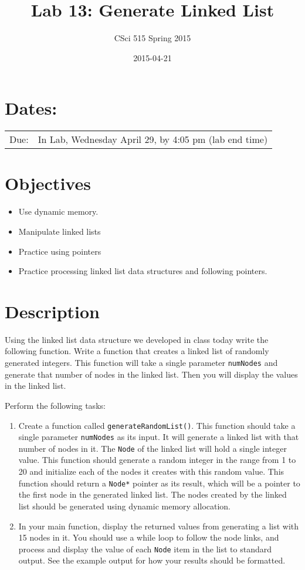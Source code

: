 \documentclass[11pt]{article}
\title{Lab 13: Generate Linked List}
\author{CSci 515 Spring 2015}
\date{2015-04-21}
\begin{document}
\maketitle


\section*{Dates:}
\label{sec-1}


\begin{center}
\begin{tabular}{ll}
 Due:  &  In Lab, Wednesday April 29, by 4:05 pm (lab end time)  \\
\end{tabular}
\end{center}
\section*{Objectives}
\label{sec-2}

\begin{itemize}
\item Use dynamic memory.
\item Manipulate linked lists
\item Practice using pointers
\item Practice processing linked list data structures and following pointers.
\end{itemize}
\section*{Description}
\label{sec-3}

Using the linked list data structure we developed in class today write
the following function.  Write a function that creates
a linked list of randomly generated integers.  This function
will take a single parameter \verb~numNodes~ and generate that number of nodes
in the linked list.  Then you will display the values in the linked
list.

Perform the following tasks:

\begin{enumerate}
\item Create a function called \verb~generateRandomList()~.  This function
   should take a single parameter \verb~numNodes~ as its input.  It
   will generate a linked list with that number of nodes in it.  The
   \verb~Node~ of the linked list will hold a single integer value.  This
   function should generate a random integer in the range from 1 to
   20 and initialize each of the nodes it creates with this random
   value.  This function should return a \verb~Node*~ pointer as its
   result, which will be a pointer to the first node in the
   generated linked list.  The nodes created by the linked list should
   be generated using dynamic memory allocation.
\item In your main function, display the returned values from generating
   a list with 15 nodes in it.  You should use a while loop to
   follow the node links, and process and display the value of each
   \verb~Node~ item in the list to standard output.  See the example 
   output for how your results should be formatted.
\end{enumerate}
\end{document}

